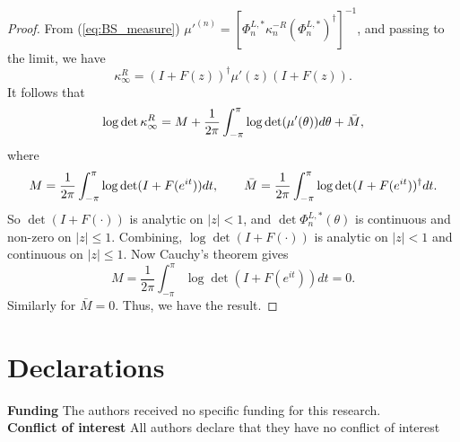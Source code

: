 \documentclass[11pt]{article}
\def\ni{\noindent}
\def\ni{\noindent}
\begin{document}
\begin{proof}
    From (\ref{eq:BS_measure}) $\mu'^{
    (n)}=[\Phi_{n}^{L,*} \kappa_{n}^{-R}(\Phi_{n}^{L,*})^{\dag}]^{-1}$, and passing to the limit, we have $$\kappa_{\infty}^{R} = (I + F(z))^{\dag} \mu'(z) (I + F(z)).$$    
   It follows that  $$\log \det \kappa_{\infty}^{R}=
    M + 
    \frac{1}{2\pi}\int_{-\pi}^{\pi}\log \det (\mu'(\theta)) d\theta + \Bar{M},
    $$
    where 
    $$
    M = \frac{1}{2\pi}\int_{-\pi}^{\pi}\log \det (I + F(e^{it}))dt, \qquad
    \Bar{M} = \frac{1}{2\pi}\int_{-\pi}^{\pi}\log \det (I + F(e^{it}))^{\dag}dt.
    $$
    So $\det (I + F(\cdot)) $ is analytic on $|z|<1$, and $\det \Phi_{n}^{L,*}(\theta) $ is continuous and non-zero on $|z|\leq 1$. Combining, $\log \det (I + F(\cdot)) $ is analytic on $|z|<1$ and continuous on $|z|\leq 1$. Now Cauchy's theorem gives 
    $$
    M = \frac{1}{2\pi}\int_{-\pi}^{\pi}\log \det (I + F(e^{it}))dt = 0.
    $$
    Similarly for $\bar{M}=0$. Thus, we have the result.

\end{proof}

\section*{Declarations}
\ni \textbf{Funding} The authors received no specific funding for this research.\\

\ni \textbf{Conflict of interest} All authors declare that they have no conflict of interest

\end{document}
